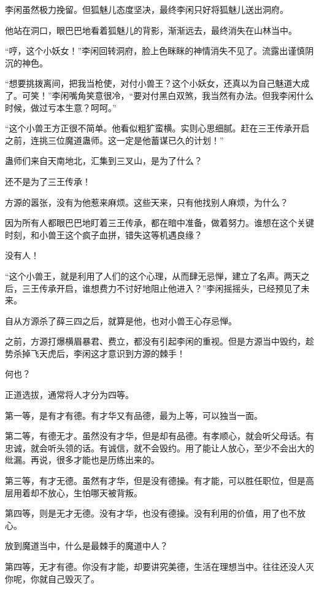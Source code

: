 \begin{this_body}
李闲虽然极力挽留。但狐魅儿态度坚决，最终李闲只好将狐魅儿送出洞府。

他站在洞口，眼巴巴地看着狐魅儿的背影，渐渐远去，最终消失在山林当中。

“哼，这个小妖女！”李闲回转洞府，脸上色眯眯的神情消失不见了。流露出谨慎阴沉的神色。

“想要挑拨离间，把我当枪使，对付小兽王？这个小妖女，还真以为自己魅道大成了。可笑！”李闲嘴角笑意很冷，“要对付黑白双煞，我当然有办法。但我李闲什么时候，做过亏本生意？呵呵。”

“这个小兽王方正很不简单。他看似粗犷蛮横。实则心思细腻。赶在三王传承开启之前，连挑三位魔道蛊师。这一定是他蓄谋已久的计划！”

蛊师们来自天南地北，汇集到三叉山，是为了什么？

还不是为了三王传承！

方源的嚣张，没有为他惹来麻烦。这些天来，只有他找别人麻烦，为什么？

因为所有人都眼巴巴地盯着三王传承，都在暗中准备，做着努力。谁想在这个关键时刻，和小兽王这个疯子血拼，错失这等机遇良缘？

没有人！

“这个小兽王，就是利用了人们的这个心理，从而肆无忌惮，建立了名声。两天之后，三王传承开启，谁想费力不讨好地阻止他进入？”李闲摇摇头，已经预见了未来。

自从方源杀了薛三四之后，就算是他，也对小兽王心存忌惮。

之前，方源打爆横眉暴君、费立，都没有引起李闲的重视。但是方源当中毁约，趁势杀掉飞天虎后，李闲这才意识到方源的棘手！

何也？

正道选拔，通常将人才分为四等。

第一等，是有才有德。有才华又有品德，最为上等，可以独当一面。

第二等，有德无才。虽然没有才华，但是却有品德。有孝顺心，就会听父母话。有忠诚，就会听头领的话。有诚信，就不会毁约。用了能让人放心，至少不会出大的纰漏。再说，很多才能也是历练出来的。

第三等，有才无德。虽然有才华，但是没有德操。有才能，可以胜任职位，但是高层用着却不放心，生怕哪天被背叛。

第四等，则是无才无德。没有才华，也没有德操。没有利用的价值，用了也不放心。

放到魔道当中，什么是最棘手的魔道中人？

第四等，无才有德。你没有才能，却要讲究美德，生活在理想当中。往往还没人灭你呢，你就自己毁灭了。


\end{this_body}
